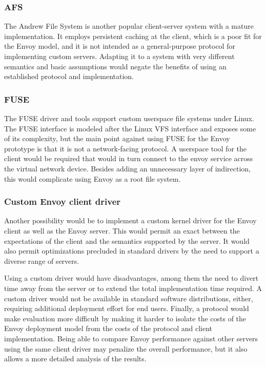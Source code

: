 \subsubsection{AFS}

The Andrew File System is another popular client-server system with a mature implementation. It employs persistent caching at the client, which is a poor fit for the Envoy model, and it is not intended as a general-purpose protocol for implementing custom servers. Adapting it to a system with very different semantics and basic assumptions would negate the benefits of using an established protocol and implementation.

\subsubsection{FUSE}

The FUSE driver and tools support custom userspace file systems under Linux. The FUSE interface is modeled after the Linux VFS interface and exposes some of its complexity, but the main point against using FUSE for the Envoy prototype is that it is not a network-facing protocol. A userspace tool for the client would be required that would in turn connect to the envoy service across the virtual network device. Besides adding an unnecessary layer of indirection, this would complicate using Envoy as a root file system.

\subsubsection{Custom Envoy client driver}

Another possibility would be to implement a custom kernel driver for the Envoy client as well as the Envoy server. This would permit an exact between the expectations of the client and the semantics supported by the server. It would also permit optimizations precluded in standard drivers by the need to support a diverse range of servers.

Using a custom driver would have disadvantages, among them the need to divert time away from the server or to extend the total implementation time required. A custom driver would not be available in standard software distributions, either, requiring additional deployment effort for end users. Finally, a protocol would make evaluation more difficult by making it harder to isolate the costs of the Envoy deployment model from the costs of the protocol and client implementation. Being able to compare Envoy performance against other servers using the same client driver may penalize the overall performance, but it also allows a more detailed analysis of the results.

